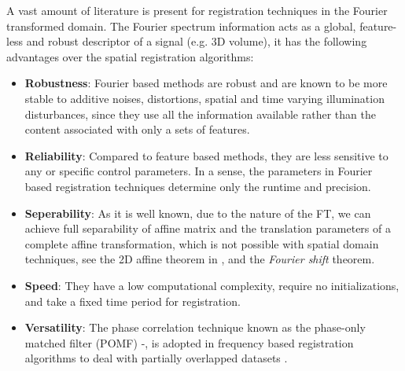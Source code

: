 \documentclass{UCF_ETD}
\begin{document}
A vast amount of literature is present for registration techniques in the Fourier transformed domain. The Fourier spectrum information acts as a global, feature-less and robust descriptor \cite{Bracewell86} of a signal (e.g. $3$D volume), it has the following advantages over the spatial registration algorithms:
\begin{itemize}
  \item {\bf Robustness}: Fourier based methods are robust and  are  known to be more stable to additive noises, distortions, spatial and time varying illumination disturbances, since they use all the information available rather than the content associated with only a sets of features.
  \item {\bf Reliability}: Compared to feature based methods, they are less sensitive to any or specific control parameters. In a sense, the parameters in Fourier based registration techniques determine only the runtime and precision. 
  \item {\bf Seperability}: As it is well known, due to the nature of the FT, we can achieve full separability of affine matrix and the translation parameters of a complete affine transformation, which is not possible with spatial domain techniques, see the 2D affine theorem in \cite{Papoulis1977}, \cite{Bracewell93} and the \emph{Fourier shift} theorem. 
  \item {\bf Speed}: They have a low computational complexity, require no initializations, and take a fixed time period for registration. 
  \item {\bf Versatility}: 
  The phase correlation technique known as the phase-only matched filter (POMF) \cite{Kuglin1975}-\cite{Reddy1996}, is adopted in frequency based registration algorithms to deal with partially overlapped datasets \cite{Sun2014}. 
\end{itemize}
\end{document}
